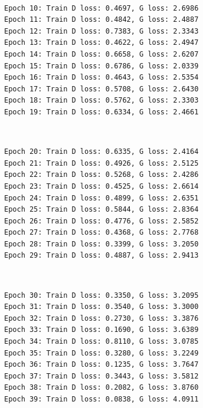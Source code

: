 \documentclass[11pt]{article}
\begin{document}
    \begin{center}
    \end{center}
    { \hspace*{\fill} \\}
    
    \begin{Verbatim}[commandchars=\\\{\}]
Epoch 10: Train D loss: 0.4697, G loss: 2.6986
Epoch 11: Train D loss: 0.4842, G loss: 2.4887
Epoch 12: Train D loss: 0.7383, G loss: 2.3343
Epoch 13: Train D loss: 0.4622, G loss: 2.4947
Epoch 14: Train D loss: 0.6658, G loss: 2.6207
Epoch 15: Train D loss: 0.6786, G loss: 2.0339
Epoch 16: Train D loss: 0.4643, G loss: 2.5354
Epoch 17: Train D loss: 0.5708, G loss: 2.6430
Epoch 18: Train D loss: 0.5762, G loss: 2.3303
Epoch 19: Train D loss: 0.6334, G loss: 2.4661

    \end{Verbatim}

    \begin{center}
    \end{center}
    { \hspace*{\fill} \\}
    
    \begin{Verbatim}[commandchars=\\\{\}]
Epoch 20: Train D loss: 0.6335, G loss: 2.4164
Epoch 21: Train D loss: 0.4926, G loss: 2.5125
Epoch 22: Train D loss: 0.5268, G loss: 2.4286
Epoch 23: Train D loss: 0.4525, G loss: 2.6614
Epoch 24: Train D loss: 0.4899, G loss: 2.6351
Epoch 25: Train D loss: 0.5844, G loss: 2.8364
Epoch 26: Train D loss: 0.4776, G loss: 2.5852
Epoch 27: Train D loss: 0.4368, G loss: 2.7768
Epoch 28: Train D loss: 0.3399, G loss: 3.2050
Epoch 29: Train D loss: 0.4887, G loss: 2.9413

    \end{Verbatim}

    \begin{center}
    \end{center}
    { \hspace*{\fill} \\}
    
    \begin{Verbatim}[commandchars=\\\{\}]
Epoch 30: Train D loss: 0.3350, G loss: 3.2095
Epoch 31: Train D loss: 0.3540, G loss: 3.3000
Epoch 32: Train D loss: 0.2730, G loss: 3.3876
Epoch 33: Train D loss: 0.1690, G loss: 3.6389
Epoch 34: Train D loss: 0.8110, G loss: 3.0785
Epoch 35: Train D loss: 0.3280, G loss: 3.2249
Epoch 36: Train D loss: 0.1235, G loss: 3.7647
Epoch 37: Train D loss: 0.3443, G loss: 3.5812
Epoch 38: Train D loss: 0.2082, G loss: 3.8760
Epoch 39: Train D loss: 0.0838, G loss: 4.0911

    \end{Verbatim}
\end{document}
